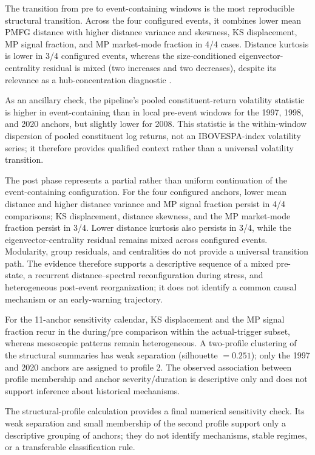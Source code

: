 \documentclass[a4paper,fleqn,review]{cas-sc}
\begin{document}


The transition from pre to event-containing windows is the most reproducible structural transition. Across the four configured events, it combines lower mean PMFG distance with higher distance variance and skewness, KS displacement, MP signal fraction, and MP market-mode fraction in 4/4 cases. Distance kurtosis is lower in 3/4 configured events, whereas the size-conditioned eigenvector-centrality residual is mixed (two increases and two decreases), despite its relevance as a hub-concentration diagnostic \citep{bonacich1987power}.

As an ancillary check, the pipeline's pooled constituent-return volatility statistic is higher in event-containing than in local pre-event windows for the 1997, 1998, and 2020 anchors, but slightly lower for 2008. This statistic is the within-window dispersion of pooled constituent log returns, not an IBOVESPA-index volatility series; it therefore provides qualified context rather than a universal volatility transition.

The post phase represents a partial rather than uniform continuation of the event-containing configuration. For the four configured anchors, lower mean distance and higher distance variance and MP signal fraction persist in 4/4 comparisons; KS displacement, distance skewness, and the MP market-mode fraction persist in 3/4. Lower distance kurtosis also persists in 3/4, while the eigenvector-centrality residual remains mixed across configured events. Modularity, group residuals, and centralities do not provide a universal transition path. The evidence therefore supports a descriptive sequence of a mixed pre-state, a recurrent distance--spectral reconfiguration during stress, and heterogeneous post-event reorganization; it does not identify a common causal mechanism or an early-warning trajectory.

For the 11-anchor sensitivity calendar, KS displacement and the MP signal fraction recur in the during/pre comparison within the actual-trigger subset, whereas mesoscopic patterns remain heterogeneous. A two-profile clustering of the structural summaries has weak separation (silhouette $=0.251$); only the 1997 and 2020 anchors are assigned to profile 2. The observed association between profile membership and anchor severity/duration is descriptive only and does not support inference about historical mechanisms.

The structural-profile calculation provides a final numerical sensitivity check. Its weak separation and small membership of the second profile support only a descriptive grouping of anchors; they do not identify mechanisms, stable regimes, or a transferable classification rule.
\end{document}
